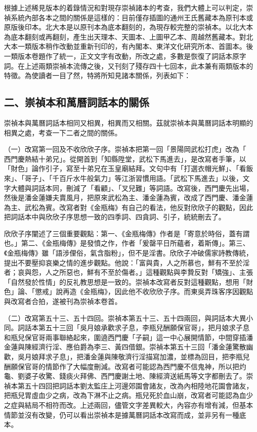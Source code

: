 根據上述稀見版本的着錄情況和對現存崇禎諸本的考查，我們大體上可以判定，崇禎系統內部各本之間的關係是這樣的：目前僅存插圖的通州王氏舊藏本為原刊本或原版後印本。北大本是以原刊本為底本翻刻的，為現存較完整的崇禎本。以北大本為底本翻刻或再翻刻，產生出天理本、天圖本、上圖甲乙本、周越然舊藏本。對北大本一類版本稍作改動並重新刊印的，有內閣本、東洋文化研究所本、首圖本。後一類版本卷題作了統一，正文文字有改動，所改之處，多數是恢復了詞話本原字詞。在上述兩類崇禎本流傳之後，又刊刻了殘存四十七回本，此本兼有兩類版本的特徵。為使讀者一目了然，特將所知見諸本關係，列表如下：
{\clearpage}


\subsection*{二、崇禎本和萬曆詞話本的關係}

崇禎本與萬曆詞話本相同又相異，相異而又相關。茲就崇禎本與萬曆詞話本明顯的相異之處，考查一下二者之間的關係。

（一）改寫第一回及不收欣欣子序。崇禎本把第一回「景陽岡武松打虎」改為「 西門慶熱結十弟兄」。從開首到「知縣陞堂，武松下馬進去」，是改寫者手筆，以 「財色」論作引子，寫至十弟兄在玉皇廟結拜。文句中有「打選衣帽光鮮」、「看飯來」、「哥子」、「千百斤水牛般氣力」等江浙習慣用語。「武松下馬進去」以後，文字大體與詞話本同，刪減了「看顧」、「叉兒難」等詞語。改寫後，西門慶先出場，然後是潘金蓮嫌夫賣風月，把原來武松為主、潘金蓮為賓，改成了西門慶、潘金蓮為主、武松為賓。改寫者對《金瓶梅》有自己的看法，他反對欣欣子的觀點，因此把詞話本中與欣欣子序思想一致的四季詞、四貪詞、引子，統統刪去了。

欣欣子序闡述了三個重要觀點：第一、《金瓶梅傳》作者是「寄意於時俗，蓋有謂也。」第二、《金瓶梅傳》是發憤之作，作者「爰罄平日所蘊者，着斯傳」。第三、《金瓶梅傳》雖「語涉俚俗，氣含脂粉」，但不是淫書。欣欣子冲破儒家詩教傳統，提出不要壓抑哀樂之情的進步觀點。他說：「富與貴，人之所慕也，鮮有不至於淫者；哀與怨，人之所惡也，鮮有不至於傷者。」這種觀點與李贄反對「矯強」、主張「自然發於性情」的反礼教思想是一致的。崇禎本改寫者反對這種觀點，想用「財色」論、「懲戒」說再造《金瓶梅》，因此他不收欣欣子序。而東吳弄珠客序因觀點與改寫者合拍，遂被刊為崇禎本卷首。

（二）改寫第五十三、五十四回。崇禎本第五十三、五十四兩回，與詞話本大異小同。詞話本第五十三回「吳月娘承歡求子息，李瓶兒酬願保官哥」，把月娘求子息和瓶兒保官哥兩事聯絡起來，圍遶西門慶「子嗣」這一中心展開情節，中間穿插潘金蓮與陳經濟行淫、應伯爵為李三、黃四借銀。崇禎本第五十三回「潘金蓮驚散幽歡，吳月娘拜求子息」，把潘金蓮與陳敬濟行淫描寫加濃，並標為回目，把李瓶兒酬願保官哥的情節作了大幅度刪減。改寫者可能認為西門慶不信鬼神，所以把灼龜、劉婆子收驚、錢痰火拜佛、西門慶謝土地、陳經濟送紙馬等文字都刪去了。崇禎本第五十四回把詞話本劉太監庄上河邊郊園會諸友，改為內相陸地花園會諸友，把瓶兒胃虛血少之病，改為下淋不止之病。瓶兒死於血山崩，改寫者可能認為血少之症與結局不相符而改。上述兩回，儘管文字差異較大，內容亦有增有減，但基本情節並沒有改變，仍可以看出崇禎本是據萬曆詞話本改寫而成，並非另有一種底本。

